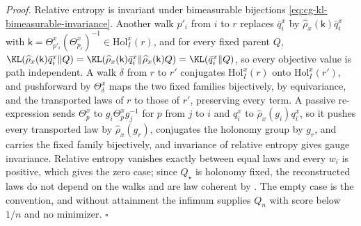 \noindent\emph{Proof.}
Relative entropy is invariant under bimeasurable bijections \eqref{eq:cg-kl-bimeasurable-invariance}.
Another walk $p'_i$ from $i$ to $r$ replaces $\bar q^x_i$ by $\widehat\rho_x(\mathsf k)\bar q^x_i$ with
$\mathsf k=\Theta^x_{p'_i}(\Theta^x_{p_i})^{-1}\in\mathrm{Hol}^x_I(r)$, and for every fixed parent $Q$,
$\KL(\widehat\rho_x(\mathsf k)\bar q^x_i\Vert Q)=\KL(\widehat\rho_x(\mathsf k)\bar q^x_i\Vert\widehat\rho_x(\mathsf k)Q)=\KL(\bar q^x_i\Vert Q)$,
so every objective value is path independent. A walk $\delta$ from $r$ to $r'$ conjugates
$\mathrm{Hol}^x_I(r)$ onto $\mathrm{Hol}^x_I(r')$, and pushforward by $\Theta^x_\delta$ maps the two fixed
families bijectively, by equivariance, and the transported laws of $r$ to those of $r'$, preserving every
term. A passive re-expression sends $\Theta^x_p$ to $g_i\Theta^x_pg_j^{-1}$ for $p$ from $j$ to $i$ and
$q^x_i$ to $\widehat\rho_x(g_i)q^x_i$, so it pushes every transported law by $\widehat\rho_x(g_r)$,
conjugates the holonomy group by $g_r$, and carries the fixed family bijectively, and invariance of
relative entropy gives gauge invariance. Relative entropy vanishes exactly between equal laws and every
$w_i$ is positive, which gives the zero case; since $Q_\star$ is holonomy fixed, the reconstructed laws do
not depend on the walks and are law coherent by . The empty case is the
convention, and without attainment the infimum supplies $Q_n$ with score below $1/n$ and no minimizer.
$\square$

